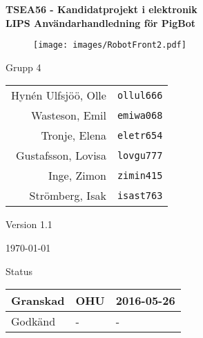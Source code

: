 \documentclass[11pt]{article}
\begin{document}
\begin{titlepage}
\begin{center}


{\Large\bfseries TSEA56 - Kandidatprojekt i elektronik \\ LIPS Användarhandledning för PigBot}

\begin{figure}[!htbp]
  \begin{center}
    \texttt{[image: images/RobotFront2.pdf]}
  \end{center}
\end{figure}


  \begin{minipage}{0.5\textwidth}
    \centering
 Grupp 4 \\
\begin{tabular}{rl}
Hynén Ulfsjöö, Olle&\verb+ollul666+
\\
Wasteson, Emil&\verb+emiwa068+
\\
Tronje, Elena&\verb+eletr654+
\\
Gustafsson, Lovisa&\verb+lovgu777+
\\
Inge, Zimon&\verb+zimin415+
\\
Strömberg, Isak&\verb+isast763+
\\
\end{tabular}
\end{minipage}%
\begin{minipage}{0.5\textwidth}
  \centering
Version 1.1

\today
\vspace{2em}

Status
\begin{longtable}{|l|l|l|} \hline

Granskad & OHU & 2016-05-26 \\ \hline
Godkänd & - & - \\ \hline
 
\end{longtable}
\end{minipage}


\end{center}
\end{titlepage}
\end{document}
